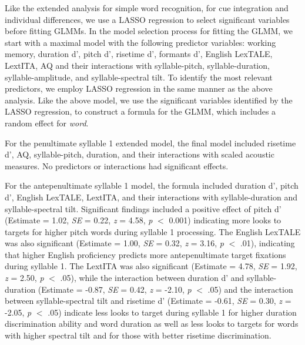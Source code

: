 Like the extended analysis for simple word recognition, for cue integration and individual differences, we use a LASSO regression to select significant variables before fitting GLMMs. In the model selection process for fitting the GLMM, we start with a maximal model with the following predictor variables: working memory, duration d', pitch d', risetime d', formants d', English LexTALE, LextITA, AQ and their interactions with syllable-pitch, syllable-duration, syllable-amplitude, and syllable-spectral tilt. To identify the most relevant predictors, we employ LASSO regression in the same manner as the above analysis. Like the above model, we use the significant variables identified by the LASSO regression, to construct a formula for the GLMM, which includes a random effect for \textit{word}. 

For the penultimate syllable 1 extended model, the final model included risetime d', AQ, syllable-pitch, duration, and their interactions with scaled acoustic measures. No predictors or interactions had significant effects.

For the antepenultimate syllable 1 model, the formula included duration d', pitch d', English LexTALE, LextITA, and their interactions with syllable-duration and syllable-spectral tilt. Significant findings included a positive effect of pitch d' (Estimate = 1.02, \textit{SE} = 0.22, \textit{z} = 4.58, \textit{p} $<$ 0.001) indicating more looks to targets for higher pitch words during syllable 1 processing. The English LexTALE was also significant (Estimate = 1.00, \textit{SE} = 0.32, \textit{z} = 3.16, \textit{p} $<$ .01), indicating that higher English proficiency predicts more antepenultimate target fixations during syllable 1. The LextITA was also significant (Estimate = 4.78, \textit{SE} = 1.92, \textit{z} = 2.50, \textit{p} $<$ .05), while the interaction between duration d' and syllable-duration (Estimate = -0.87, \textit{SE} = 0.42, \textit{z} = -2.10, \textit{p} $<$ .05) and the interaction between syllable-spectral tilt and risetime d' (Estimate = -0.61, \textit{SE} = 0.30, \textit{z} = -2.05, \textit{p} $<$ .05) indicate less looks to target during syllable 1 for higher duration discrimination ability and word duration as well as less looks to targets for words with higher spectral tilt and for those with better risetime discrimination.

